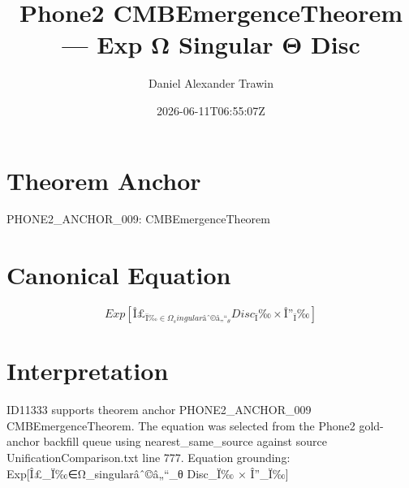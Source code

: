 \documentclass[11pt]{article}
\title{Phone2 CMBEmergenceTheorem — Exp Ω Singular Θ Disc}
\author{Daniel Alexander Trawin}
\date{2026-06-11T06:55:07Z}
\begin{document}
\maketitle
\section*{Theorem Anchor}
PHONE2_ANCHOR_009: CMBEmergenceTheorem
\section*{Canonical Equation}
\[
Exp[Î£_{Ï‰∈Ω_singularâˆ©â„“_θ} Disc_Ï‰ × Î”_Ï‰]
\]
\section*{Interpretation}
ID11333 supports theorem anchor PHONE2_ANCHOR_009 CMBEmergenceTheorem. The equation was selected from the Phone2 gold-anchor backfill queue using nearest_same_source against source UnificationComparison.txt line 777. Equation grounding: Exp[Î£_{Ï‰∈Ω_singularâˆ©â„“_θ} Disc_Ï‰ × Î”_Ï‰]
\end{document}
